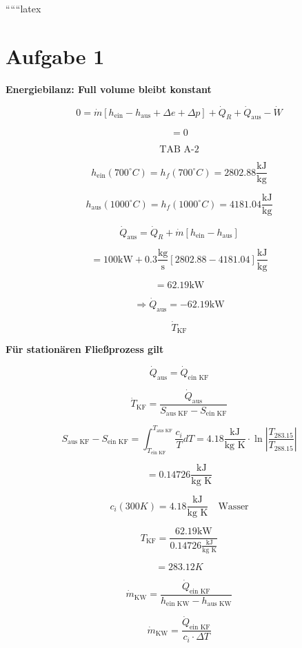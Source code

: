 
``````latex


\section*{Aufgabe 1}

\textbf{Energiebilanz: Full volume bleibt konstant}

\[
0 = \dot{m} \left[ h_{\text{ein}} - h_{\text{aus}} + \Delta e + \Delta p \right] + \dot{Q}_R + \dot{Q}_{\text{aus}} - \dot{W}
\]

\[
= 0
\]

\[
\text{TAB A-2}
\]

\[
h_{\text{ein}}(700^\circ C) = h_f(700^\circ C) = 2802.88 \frac{\text{kJ}}{\text{kg}}
\]

\[
h_{\text{aus}}(1000^\circ C) = h_f(1000^\circ C) = 4181.04 \frac{\text{kJ}}{\text{kg}}
\]

\[
\dot{Q}_{\text{aus}} = \dot{Q}_R + \dot{m} \left[ h_{\text{ein}} - h_{\text{aus}} \right]
\]

\[
= 100 \text{kW} + 0.3 \frac{\text{kg}}{\text{s}} \left[ 2802.88 - 4181.04 \right] \frac{\text{kJ}}{\text{kg}}
\]

\[
= 62.19 \text{kW}
\]

\[
\Rightarrow \dot{Q}_{\text{aus}} = -62.19 \text{kW}
\]

\[
\dot{T}_{\text{KF}}
\]

\textbf{Für stationären Fließprozess gilt}

\[
\dot{Q}_{\text{aus}} = \dot{Q}_{\text{ein KF}}
\]

\[
\dot{T}_{\text{KF}} = \frac{\dot{Q}_{\text{aus}}}{S_{\text{aus KF}} - S_{\text{ein KF}}}
\]

\[
S_{\text{aus KF}} - S_{\text{ein KF}} = \int_{T_{\text{ein KF}}}^{T_{\text{aus KF}}} \frac{c_i}{T} dT = 4.18 \frac{\text{kJ}}{\text{kg K}} \cdot \ln \left| \frac{T_{283.15}}{T_{288.15}} \right|
\]

\[
= 0.14726 \frac{\text{kJ}}{\text{kg K}}
\]

\[
c_i(300K) = 4.18 \frac{\text{kJ}}{\text{kg K}} \quad \text{Wasser}
\]

\[
T_{\text{KF}} = \frac{62.19 \text{kW}}{0.14726 \frac{\text{kJ}}{\text{kg K}}}
\]

\[
= 283.12 K
\]

\[
\dot{m}_{\text{KW}} = \frac{\dot{Q}_{\text{ein KF}}}{h_{\text{ein KW}} - h_{\text{aus KW}}}
\]

\[
\dot{m}_{\text{KW}} = \frac{\dot{Q}_{\text{ein KF}}}{c_i \cdot \Delta T}
\]

